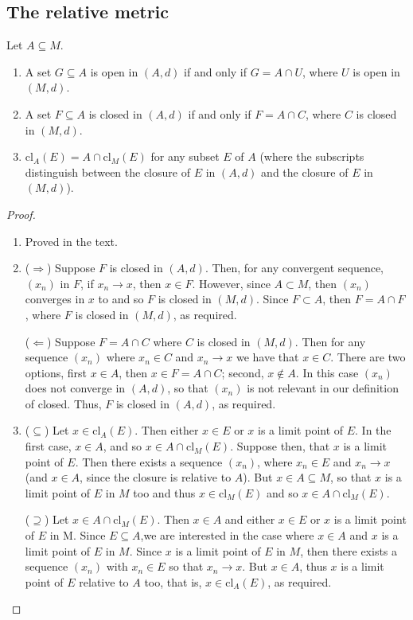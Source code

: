 \subsection{The relative metric}


\begin{exercise}{61}
Let $A\subseteq M$.
\begin{enumerate}
    \item A set $G\subseteq A$ is open in $(A,d)$ if and only if $G=A\cap U$, where $U$ is open in $(M,d)$.
    \item A set $F\subseteq A$ is closed in $(A,d)$ if and only if $F=A\cap C$, where $C$ is closed in $(M,d)$.
    \item $\text{cl}_A(E)=A\cap\text{cl}_M(E)$ for any subset $E$ of $A$ (where the subscripts distinguish between the closure of $E$ in $(A,d)$ and the closure of $E$ in $(M,d)$).
\end{enumerate}
\end{exercise}
\begin{proof}
\begin{enumerate}
    \item Proved in the text.
    \item ($\Rightarrow$)
    Suppose $F$ is closed in $(A,d)$.
    Then, for any convergent sequence, $(x_n)$ in $F$, if $x_n\to x$, then $x\in F$.
    However, since $A\subset M$, then $(x_n)$ converges in $x$ to and so $F$ is closed in $(M,d)$.
    Since $F\subset A$, then $F=A\cap F$, where $F$ is closed in $(M,d)$, as required.

    ($\Leftarrow$)
    Suppose $F=A\cap C$ where $C$ is closed in $(M,d)$.
    Then for any sequence $(x_n)$ where $x_n\in C$ and $x_n\to x$ we have that $x\in C$.
    There are two options, first $x\in A$, then $x\in F=A\cap C$;
    second, $x\notin A$.
    In this case $(x_n)$ does not converge in $(A,d)$, so that $(x_n)$ is not relevant in our definition of closed. 
    Thus, $F$ is closed in $(A,d)$, as required.
    \item ($\subseteq$)
    Let $x\in \text{cl}_A(E)$.
    Then either $x\in E$ or $x$ is a limit point of $E$.
    In the first case, $x\in A$, and so $x\in A\cap\text{cl}_M(E)$.
    Suppose then, that $x$ is a limit point of $E$.
    Then there exists a sequence $(x_n)$, where $x_n\in E$ and $x_n\to x$ (and $x\in A$, since the closure is relative to $A$).
    But $x\in A\subseteq M$, so that $x$ is a limit point of $E$ in $M$ too and thus $x\in\text{cl}_M(E)$ and so $x\in A\cap\text{cl}_M(E)$.

    ($\supseteq$)
    Let $x\in A\cap\text{cl}_M(E)$.
    Then $x\in A$ and either $x\in E$ or $x$ is a limit point of $E$ in M.
    Since $E\subseteq A$,we are interested in the case where $x\in A$ and $x$ is a limit point of $E$ in $M$.
    Since $x$ is a limit point of $E$ in $M$, then there exists a sequence $(x_n)$ with $x_n\in E$ so that $x_n\to x$.
    But $x\in A$, thus $x$ is a limit point of $E$ relative to $A$ too, that is, $x\in\text{cl}_A(E)$, as required.
\end{enumerate}
\end{proof} 

